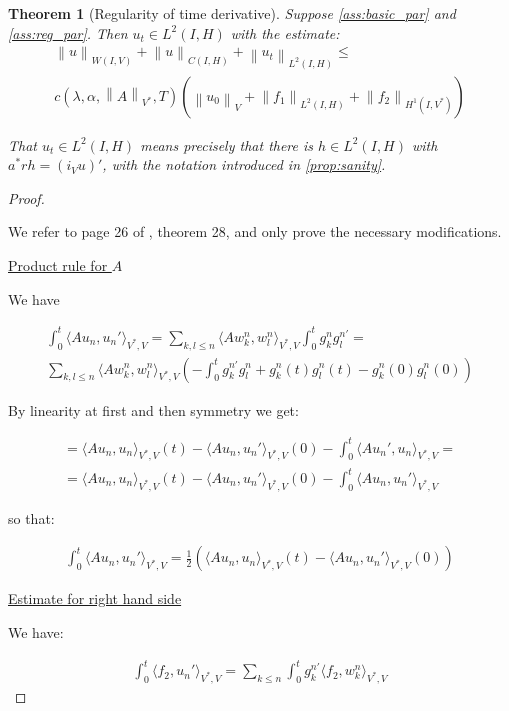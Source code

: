\documentclass[english,a4paper,12pt,oneside]{scrbook}
\theoremstyle{break}
\newtheorem{thm}[equation]{Theorem}
\newenvironment{mproof}[1][\proofname]{%
  \begin{proof}[#1]$ $\par\nobreak\ignorespaces
}{%
  \end{proof}
}
\renewcommand*{\proofname}{Proof}
\theoremstyle{remark}
\newcommand{\norm}[1]{\left\lVert#1\right\rVert}
\newcommand{\VN}[1]{\norm{#1}_{V}}
\newcommand{\VSN}[1]{\norm{#1}_{V^*}}
\begin{document}
\begin{thm}[Regularity of time derivative]
\label{thm:reg_time}
Suppose \cref{ass:basic_par} and \cref{ass:reg_par}. Then $u_t \in L^2(I, H)$ with the estimate:
\begin{align}
	\norm{u}_{W(I,V)} + \norm{u}_{C(I,H)} + \norm{u_t}_{L^2(I,H)} \leq\\ c(\lambda, \alpha, \VSN{A}, T)(\VN{u_0}+\norm{f_1}_{L^2(I,H)} + \norm{f_2}_{H^1(I,V^*)})
\end{align}

That $u_t \in L^2(I, H)$ means precisely that there is $h \in L^2(I,H)$ with $a^* r h = (i_V u)'$, with the notation introduced in \cref{prop:sanity}.

\end{thm}
\begin{mproof}
We refer to page 26 of \cite{gilardi}, theorem 28, and only prove the necessary modifications.

\underline{Product rule for $A$}

We have 

\begin{align*}
\int_0^t \langle Au_n,u_n' \rangle_{V^*,V} = \sum_{k,l\leq n} \langle Aw^n_k,w^n_l \rangle_{V^*,V} \int_0^t g_k^n g_l^{n '} = \\
\sum_{k,l\leq n} \langle Aw^n_k,w^n_l \rangle_{V^*,V} \left (-\int_0^t g_k^{n'} g_l^n + g_k^n(t) g_l^n(t)-g_k^n(0) g_l^n(0) \right )
\end{align*}

By linearity at first and then symmetry we get:

\begin{align*}
	= \langle Au_n,u_n \rangle_{V^*,V}(t)-\langle Au_n,u_n' \rangle_{V^*,V}(0)-\int_0^t\langle Au_n',u_n \rangle_{V^*,V}=\\
	= \langle Au_n,u_n \rangle_{V^*,V}(t)-\langle Au_n,u_n' \rangle_{V^*,V}(0)-\int_0^t\langle Au_n,u_n' \rangle_{V^*,V}
\end{align*}

so that:

\begin{align*}
	\int_0^t \langle Au_n,u_n' \rangle_{V^*,V} = \frac{1}{2}\left( \langle Au_n,u_n \rangle_{V^*,V}(t)-\langle Au_n,u_n' \rangle_{V^*,V}(0) \right )
\end{align*}

\underline{Estimate for right hand side}

We have:

\begin{align*}
	\int_0^t \langle f_2,u_n' \rangle_{V^*,V} = \sum_{k\leq n}\int_0^tg_k^{n'}\langle f_2,w_k^n \rangle_{V^*,V}
\end{align*}


\end{mproof}
\end{document}

